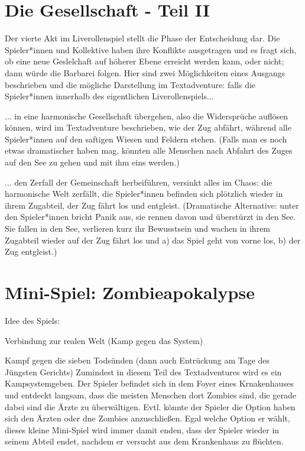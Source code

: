 \documentclass[12pt, a4paper, openany]{report}
\let\tempone\itemize
\let\temptwo\enditemize
\renewenvironment{itemize}{\tempone\addtolength{\itemsep}{-0.5\baselineskip}}{\temptwo}
\begin{document}
\section{Die Gesellschaft - Teil II} \label{die-gesellschaft2}
Der vierte Akt im Liverollenspiel stellt die Phase der Entscheidung dar. 
Die Spieler*innen und Kollektive haben ihre Konflikte ausgetragen und es fragt sich, ob eine neue Geslelchaft auf höherer Ebene erreicht werden kann, oder nicht; dann würde die Barbarei folgen.
Hier sind zwei Möglichkeiten eines Ausgangs beschrieben und die mögliche Darstellung im Textadventure: falls die Spieler*innen innerhalb des eigentlichen Liverollenspiels...
\begin{itemize}
\item[1.] ... in eine harmonische Gesellschaft übergehen, also die Widersprüche auflösen können, wird im Textadventure beschrieben, wie der Zug abfährt, während alle Spieler*innen auf den saftigen Wiesen und Feldern stehen. 
(Falls man es noch etwas dramatischer haben mag, könnten alle Menschen nach Abfahrt des Zuges auf den See zu gehen und mit ihm eins werden.)
\item[2.] ... den Zerfall der Gemeinschaft herbeiführen, versinkt alles im Chaos: die harmonische Welt zerfällt, die Spieler*innen befinden sich plötzlich wieder in ihrem Zugabteil, der Zug fährt los und entgleist. 
(Dramatische Alternative: unter den Spieler*innen bricht Panik aus, sie rennen davon und überstürzt in den See.
Sie fallen in den See, verlieren kurz ihr Bewusstsein und wachen in ihrem Zugabteil wieder auf der Zug fährt los und a) das Spiel geht von vorne los, b) der Zug entgleist.)
\end{itemize}

\section{Mini-Spiel: Zombieapokalypse} \label{zombieapokalypse}
Idee des Spiels:
\begin{itemize}
\item Verbindung zur realen Welt (Kamp gegen das System)
\item Kampf gegen die sieben Todsünden (dann auch Entrückung am Tage des Jüngsten Gerichts)
\end{itemize}
Zumindest in diesem Teil des Textadventures wird es ein Kampsystemgeben. 
Der Spieler befindet sich in dem Foyer eines Krnakenhauses und entdeckt langsam, dass die meisten Menschen dort Zombies sind, die gerade dabei sind die Ärzte zu überwältigen. 
Evtl. könnte der Spieler die Option haben sich den Ärzten oder dne Zombies anzuschließen.
Egal welche Option er wählt, dieses kleine Mini-Spiel wird immer damit enden, dass der Spieler wieder in seinem Abteil endet, nachdem er versucht aus dem Krankenhaus zu flüchten.
\end{document}
